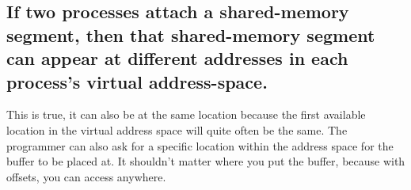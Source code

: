 \documentclass[a4paper,11pt]{article}
\begin{document}
\subsection{If two processes attach a shared-memory segment, then that shared-memory segment
can appear at different addresses in each process’s virtual address-space.}
This is true, it can also be at the same location because the first available location
in the virtual address space will quite often be the same.
The programmer can also ask for a specific location within the address space for the
buffer to be placed at.
It shouldn't matter where you put the buffer, because with offsets, you can access anywhere.
\end{document}
